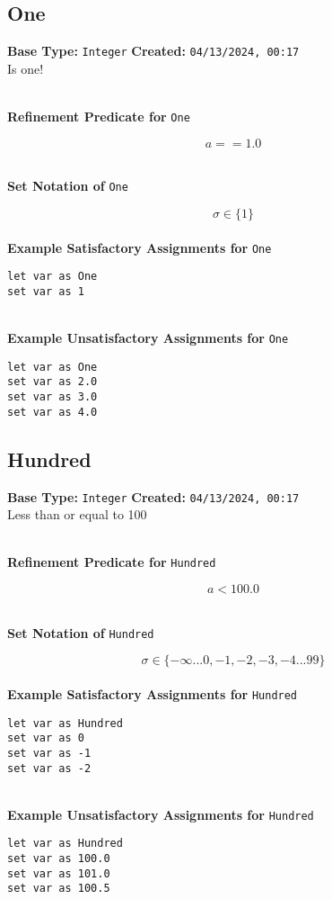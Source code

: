 \documentclass{article}
\begin{document}
\subsection{One}
\textbf{Base Type:} \verb|Integer| \hfill \textbf{Created:} \verb|04/13/2024, 00:17| \\
Is one!

\textbf{\\ Refinement Predicate for } \texttt{One}

$$ a == 1.0 $$

\textbf{\\ Set Notation of } \texttt{One}

$$\sigma \in \{ 1 \}$$ \ \
\textbf{\\ Example Satisfactory Assignments for } \texttt{One}
\begin{verbatim}
let var as One
set var as 1
\end{verbatim}


\textbf{\\ Example Unsatisfactory Assignments for } \texttt{One}
\begin{verbatim}
let var as One
set var as 2.0
set var as 3.0
set var as 4.0
\end{verbatim}


\clearpage

\subsection{Hundred}
\textbf{Base Type:} \verb|Integer| \hfill \textbf{Created:} \verb|04/13/2024, 00:17| \\
Less than or equal to 100

\textbf{\\ Refinement Predicate for } \texttt{Hundred}

$$ a < 100.0 $$

\textbf{\\ Set Notation of } \texttt{Hundred}

$$\sigma \in \{ -\infty ... 0, -1, -2, -3, -4 ... 99 \}$$ \ \
\textbf{\\ Example Satisfactory Assignments for } \texttt{Hundred}
\begin{verbatim}
let var as Hundred
set var as 0
set var as -1
set var as -2
\end{verbatim}


\textbf{\\ Example Unsatisfactory Assignments for } \texttt{Hundred}
\begin{verbatim}
let var as Hundred
set var as 100.0
set var as 101.0
set var as 100.5
\end{verbatim}


\clearpage
\end{document}
